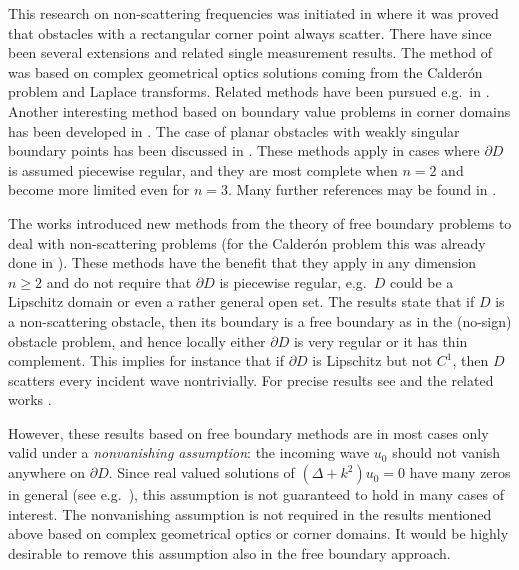 \documentclass[11pt,a4paper]{amsart}
\theoremstyle{definition}
\numberwithin{equation}{section}
\newcommand{\p}{\partial}
\begin{document}
This research on non-scattering frequencies was initiated in \cite{BlastenPaivarintaSylvester} where it was proved that obstacles with a rectangular corner point always scatter. There have since been several extensions and related single measurement results. The method of \cite{BlastenPaivarintaSylvester} was based on complex geometrical optics solutions coming from the Calder\'on problem and Laplace transforms. Related methods have been pursued e.g.\ in \cite{PaivarintaSaloVesalainen, HuSaloVesalainen, BlastenLiu1, BlastenLiu2}. Another interesting method based on boundary value problems in corner domains has been developed in \cite{ElschnerHu1, ElschnerHu2}. The case of planar obstacles with weakly singular boundary points has been discussed in \cite{LiHuYang2023}. These methods apply in cases where $\p D$ is assumed piecewise regular, and they are most complete when $n=2$ and become more limited even for $n=3$. Many further references may be found in \cite{SaloShahgholian, Liu_survey}.



The works \cite{CakoniVogelius, SaloShahgholian} introduced new methods from the theory of free boundary problems to deal with non-scattering problems (for the Calder\'on problem this was already done in \cite{AlessandriniIsakov}). These methods have the benefit that they apply in any dimension $n \geq 2$ and do not require that $\p D$ is piecewise regular, e.g.\ $D$ could be a Lipschitz domain or even a rather general open set. The results state that if $D$ is a non-scattering obstacle, then its boundary is a free boundary as in the (no-sign) obstacle problem, and hence locally either $\p D$ is very regular or it has thin complement. This implies for instance that if $\p D$ is Lipschitz but not $C^1$, then $D$ scatters every incident wave nontrivially. For precise results see \cite{CakoniVogelius, SaloShahgholian} and the related works \cite{VogeliusXiao2021, CakoniVogeliusXiao2023, KLSS2024, KSS2024a, KSS2024b}.


However, these results based on free boundary methods are in most cases only valid under a \emph{nonvanishing assumption}: the incoming wave $u_0$ should not vanish anywhere on $\p D$. Since real valued solutions of $(\Delta+k^2)u_0 = 0$ have many zeros in general (see e.g.\ \cite[Lemma 3.1]{SaloShahgholian}), this assumption is not guaranteed to hold in many cases of interest. The nonvanishing assumption is not required in the results mentioned above based on complex geometrical optics or corner domains. It would be highly desirable to remove this assumption also in the free boundary approach.
\end{document}
